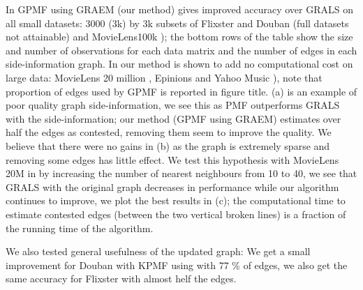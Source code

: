 \documentclass{article}
\theoremstyle{plain}
\theoremstyle{definition}
\theoremstyle{remark}
\begin{document}
In  GPMF using GRAEM (our method) gives improved accuracy over GRALS on all small datasets: 3000 (3k) by 3k subsets of Flixster and Douban  \cite{monti2017geometric} (full datasets not attainable) and MovieLens100k \cite{harper2015movielens}); the bottom rows of the table show the size and number of observations for each data matrix and the number of edges in each side-information graph.   In  our method is shown to add no computational cost on large data: MovieLens 20 million
\cite{harper2015movielens}, Epinions \cite{tang2012mtrust} and Yahoo Music \cite{rao2015collaborative,dror2011yahoo}), note that proportion of edges used by GPMF is reported in figure title.  (a) is an example of poor quality graph side-information, we see this as PMF outperforms GRALS with the side-information; our method (GPMF using GRAEM) estimates over half the edges as contested, removing them seem to improve the quality. We believe that there were no gains in  (b) as the graph is extremely sparse and removing some edges has little effect. We test this hypothesis with MovieLens 20M in  by increasing the number of nearest neighbours from 10 to 40, we see that GRALS with the original graph decreases in performance while our algorithm continues to improve, we plot the best results in  (c); the computational time to estimate contested edges (between the two vertical broken lines) is a fraction of the running time of the algorithm.

We also tested general usefulness of the updated graph: We get a small improvement for Douban with KPMF using with 77 \% of edges, we also get the same accuracy for Flixster with almost helf the edges.
\end{document}

